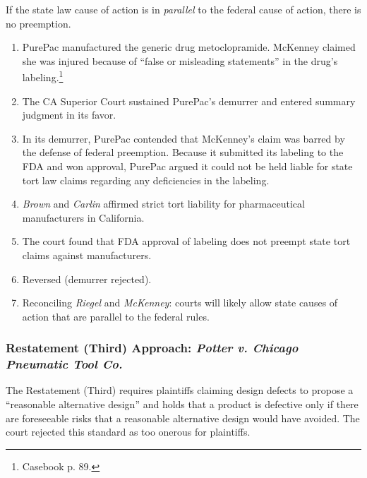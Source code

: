 If the state law cause of action is in \emph{parallel} to the federal cause of 
action, there is no preemption. 

\begin{enumerate}
    \item PurePac manufactured the generic drug metoclopramide. McKenney claimed 
    she was injured because of ``false or misleading statements'' in the drug's 
    labeling.\footnote{Casebook p. 89.}
    \item The CA Superior Court sustained PurePac's demurrer and entered summary 
    judgment in its favor.
    \item In its demurrer, PurePac contended that McKenney's claim was barred by 
    the defense of federal preemption. Because it submitted its labeling to the 
    FDA and won approval, PurePac argued it could not be held liable for state 
    tort law claims regarding any deficiencies in the labeling.
    \item \emph{Brown} and \emph{Carlin} affirmed strict tort liability for 
    pharmaceutical manufacturers in California.
    \item The court found that FDA approval of labeling does not preempt state 
    tort claims against manufacturers.
    \item Reversed (demurrer rejected).
    \item Reconciling \emph{Riegel} and \emph{McKenney}: courts will likely 
    allow state causes of action that are parallel to the federal rules.
\end{enumerate}

\subsubsection{Restatement (Third) Approach: \emph{Potter v. Chicago Pneumatic 
Tool Co.}}

The Restatement (Third) requires plaintiffs claiming design defects to propose 
a ``reasonable alternative design'' and holds that a product is defective only 
if there are foreseeable risks that a reasonable alternative design would have 
avoided. The court rejected this standard as too onerous for plaintiffs.

